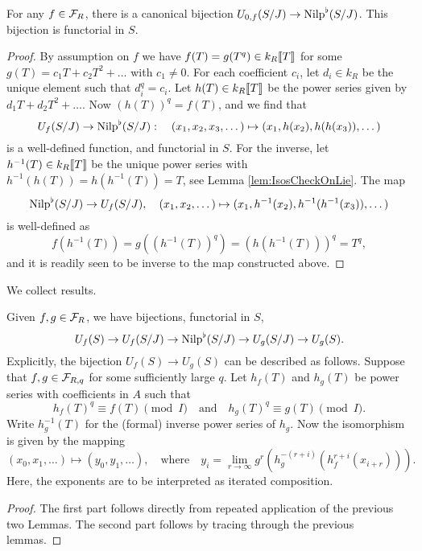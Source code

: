 \documentclass[../main.tex]{subfiles}
\begin{document}
\begin{lem}\label{lem:nilp0iso}
  For any $f \in \mathcal{F}_R$, there is a canonical 
  bijection $U_{0,f}(S/J) \to {\mathrm{Nilp}}^\flat(S/J)$. This bijection is functorial in 
  $S$.
\begin{proof}
  By assumption on $f$ we have $f(T) = g(T^{q}) \in k_R\llbracket T \rrbracket$ for some 
  $g(T) = c_1T + c_2T^2 + \dots$ with $c_1 \neq 0$. For each coefficient $c_i$, let
  $d_i \in k_R$ be the unique element such that $d_i^{q} = c_i$. Let
  $h(T) \in k_R\llbracket T \rrbracket$ be the power series given by $d_1 T + d_2
  T^2 + \dots$. Now $(h(T))^{q}=f(T)$, and we find that 
  \begin{equation*}
      U_f(S/J) \to {\mathrm{Nilp}}^\flat(S/J): \quad
      (x_1, x_2, x_3, \dots) \mapsto (x_1, h(x_2), h(h(x_3)), \dots)
  \end{equation*}
  is a well-defined function, and functorial in $S$. For the
  inverse, let $h^{-1}(T) \in k_R\llbracket T \rrbracket$ be the unique power
  series with $h^{-1}(h(T))= h(h^{-1}(T)) = T$, see Lemma
  \ref{lem:IsosCheckOnLie}. The map
  \begin{equation*}
      {\mathrm{Nilp}}^\flat(S/J) \to U_f(S/J), \quad 
      (x_1, x_2, \dots ) \mapsto (x_1, h^{-1}(x_2), h^{-1}(h^{-1}(x_3)), \dots)
  \end{equation*}
  is well-defined as
  \begin{equation*}
      f(h^{-1}(T)) = g((h^{-1}(T))^{q}) = (h(h^{-1}(T)))^{q} =
      T^{q},
  \end{equation*}
  and it is readily seen to be inverse to the map constructed above.
\end{proof}
\end{lem}

We collect results.
\begin{prop}\label{prop:pHTcalc}
  Given $f,g \in \mathcal{F}_R$, we have bijections, functorial in $S$,
  \begin{equation} 
    U_f(S) \to U_f(S/J) \to {\mathrm{Nilp}}^\flat(S/J) \to U_g(S/J) \to U_g(S).
  \end{equation}
  Explicitly, the bijection $U_f(S) \to U_g(S)$ can be described as follows.
  Suppose that $f,g \in \mathcal{F}_{R,q}$ for some sufficiently large $q$. 
  Let $h_f(T)$ and $h_g(T)$ be power series with coefficients in $A$ such that 
  $$h_f(T)^q \equiv f(T) \pmod I\quad\text{and}\quad h_g(T)^q \equiv g(T) \pmod
  I.$$
  Write $h_g^{-1}(T)$ for the (formal) inverse power series of $h_g$. 
  Now the isomorphism is given by the mapping
  \begin{equation*}
    (x_0, x_1, \dots) \mapsto (y_0, y_1, \dots), \quad \text{where} \quad y_i =
    \lim_{r \to \infty} g^r(h_g^{-(r+i)}(h_f^{r+i} (x_{i+r}))).
  \end{equation*}
  Here, the exponents are to be interpreted as iterated composition.
\begin{proof}
  The first part follows directly from repeated application of the previous
  two Lemmas. The second part follows by tracing through the previous lemmas.  
\end{proof}
\end{prop}
\end{document}
